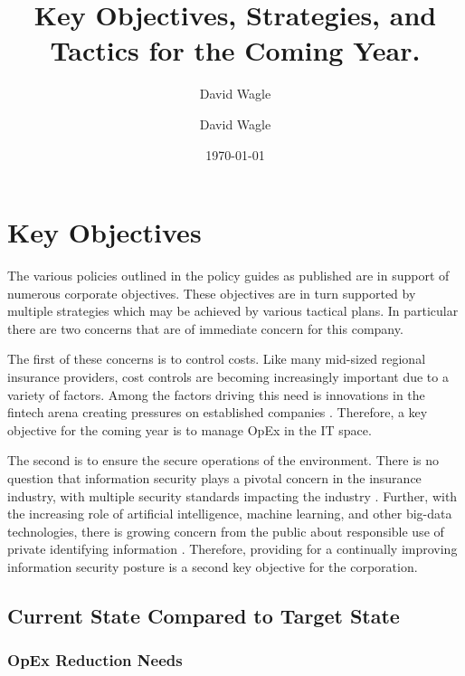 \documentclass[stu]{apa7}
\author{David Wagle}
\affiliation{School of Business, Northcentral University}
\author{David Wagle}
\date{\today}
\title{Key Objectives, Strategies, and Tactics for the Coming Year.}
\begin{document}
\maketitle
\maketitle

\section{Key Objectives}
\label{sec:org9b5e8a9}

The various policies outlined in the policy guides as published are in support of numerous corporate objectives. These objectives are in turn supported by multiple strategies which may be achieved by various tactical plans. In particular there are two concerns that are of immediate concern for this company.

The first of these concerns is to control costs. Like many mid-sized regional insurance providers, cost controls are becoming increasingly important due to a variety of factors. Among the factors driving this need is innovations in the fintech arena creating pressures on established companies \citep{bermanInnovationEntrepreneurialEcosystems2021}. Therefore, a key objective for the coming year is to manage OpEx in the IT space.

The second is to ensure the secure operations of the environment. There is no question that information security plays a pivotal concern in the insurance industry, with multiple security standards impacting the industry \citep{commiatoInformationSecurityStandards2018}. Further, with the increasing role of artificial intelligence, machine learning, and other big-data technologies, there is growing concern from the public about responsible use of private identifying information \citep{hoEnsuringTrustworthyUse2020}. Therefore, providing for a continually improving information security posture is a second key objective for the corporation.


\subsection{Current State Compared to Target State}
\label{sec:org0c4ed1e}

\subsubsection{OpEx Reduction Needs}
\label{sec:orgb773f36}
\end{document}
